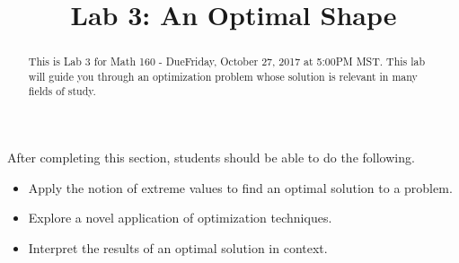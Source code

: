\documentclass{ximera}
\title{Lab 3: An Optimal Shape}
\begin{document}
\begin{abstract}
This is Lab 3 for Math 160 - DueFriday, October 27, 2017 at 5:00PM MST. This lab will guide you through an optimization problem whose solution is relevant in many fields of study.
\end{abstract}

\maketitle

\begin{sectionOutcomes}

After completing this section, students should be able to do the following.

\begin{itemize}
\item Apply the notion of extreme values to find an optimal solution to a problem.
\item Explore a novel application of optimization techniques.
\item Interpret the results of an optimal solution in context.
\end{itemize}

\end{sectionOutcomes}
\end{document}
